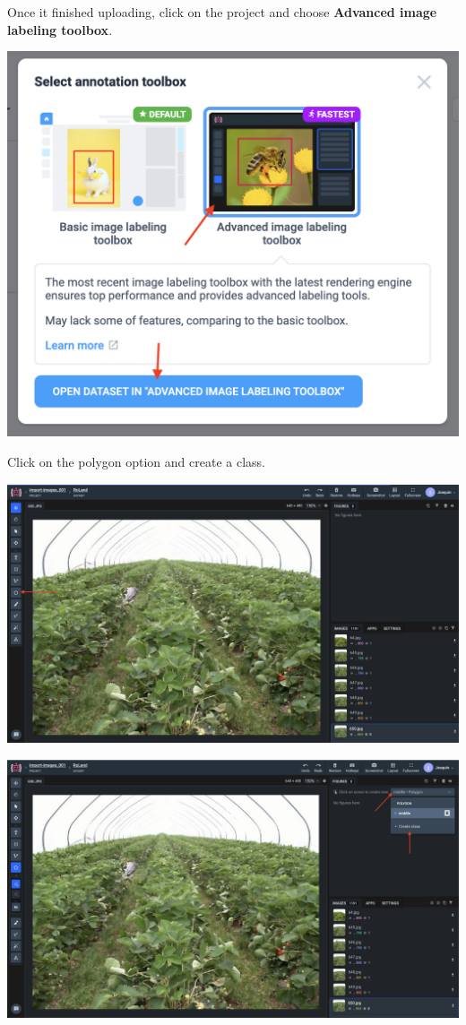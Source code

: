 \documentclass[12pt]{article}
\begin{document}
Once it finished uploading, click on the project and choose \textbf{Advanced image labeling toolbox}.
\begin{center}
\includegraphics[width=1.0\textwidth]{Bilder/upload_4}
\end{center}
\newpage

Click on the polygon option and create a class.

\begin{center}
\includegraphics[width=1.0\textwidth]{Bilder/upload_5}
\end{center}

\begin{center}
\includegraphics[width=1.0\textwidth]{Bilder/upload_6}
\end{center}
\end{document}
